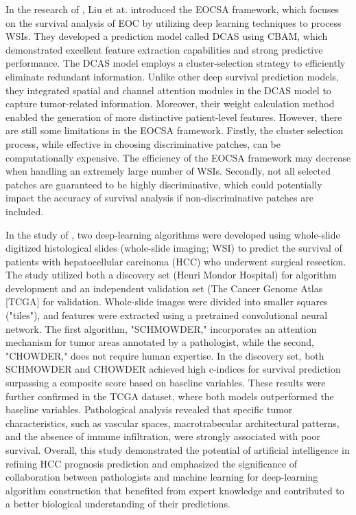 \documentclass[journal,twoside,web]{ieeecolor}
\begin{document}
In the research of \cite{liu2022eocsa}, Liu et at. introduced the EOCSA framework, which focuses on the survival analysis of EOC by utilizing deep learning techniques to process WSIs. 
They developed a prediction model called DCAS using CBAM\cite{woo2018cbam}, which demonstrated excellent feature extraction capabilities and strong predictive performance. 
The DCAS model employs a cluster-selection strategy to efficiently eliminate redundant information. 
Unlike other deep survival prediction models, they integrated spatial and channel attention modules in the DCAS model to capture tumor-related information. 
Moreover, their weight calculation method enabled the generation of more distinctive patient-level features. 
However, there are still some limitations in the EOCSA framework. 
Firstly, the cluster selection process, while effective in choosing discriminative patches, can be computationally expensive. 
The efficiency of the EOCSA framework may decrease when handling an extremely large number of WSIs. Secondly, not all selected patches are guaranteed to be highly discriminative, which could potentially impact the accuracy of survival analysis if non-discriminative patches are included. 

In the study of \cite{saillard2020predicting}, two deep-learning algorithms were developed using whole-slide digitized histological slides (whole-slide imaging; WSI) to predict the survival of patients with hepatocellular carcinoma (HCC) who underwent surgical resection. 
The study utilized both a discovery set (Henri Mondor Hospital) for algorithm development and an independent validation set (The Cancer Genome Atlas [TCGA] for validation. 
Whole-slide images were divided into smaller squares ("tiles"), and features were extracted using a pretrained convolutional neural network. 
The first algorithm, "SCHMOWDER," incorporates an attention mechanism for tumor areas annotated by a pathologist, while the second, "CHOWDER," does not require human expertise.
In the discovery set, both SCHMOWDER and CHOWDER achieved high c-indices for survival prediction surpassing a composite score based on baseline variables. 
These results were further confirmed in the TCGA dataset, where both models outperformed the baseline variables. 
Pathological analysis revealed that specific tumor characteristics, such as vascular spaces, macrotrabecular architectural patterns, and the absence of immune infiltration, were strongly associated with poor survival. 
Overall, this study demonstrated the potential of artificial intelligence in refining HCC prognosis prediction and emphasized the significance of collaboration between pathologists and machine learning for deep-learning algorithm construction that benefited from expert knowledge and contributed to a better biological understanding of their predictions.
\end{document}
